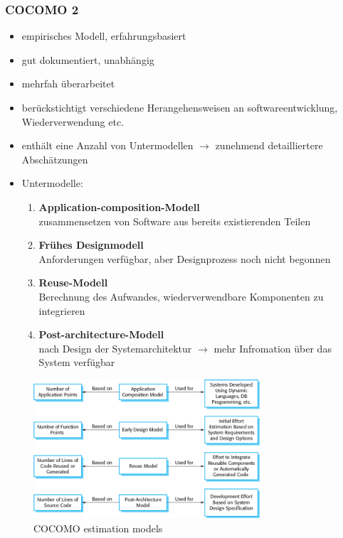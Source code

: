 \subsubsection{COCOMO 2}
\begin{itemize}
    \item empirisches Modell, erfahrungsbasiert
    \item gut dokumentiert, unabhängig
    \item mehrfah überarbeitet
    \item berückstichtigt verschiedene Herangehensweisen an softwareentwicklung, Wiederverwendung etc.
    \item enthält eine Anzahl von Untermodellen $\rightarrow$ zunehmend detailliertere Abschätzungen 
    \item Untermodelle:
    \begin{enumerate}
        \item \textbf{Application-composition-Modell} \\
        zusammensetzen von Software aus bereits existierenden Teilen
        \item \textbf{Frühes Designmodell} \\
        Anforderungen verfügbar, aber Designprozess noch nicht begonnen
        \item \textbf{Reuse-Modell} \\
        Berechnung des Aufwandes, wiederverwendbare Komponenten zu integrieren
        \item \textbf{Post-architecture-Modell}\\
        nach Design der Systemarchitektur $\rightarrow$ mehr Infromation über das System verfügbar
    \end{enumerate}
\end{itemize}
\begin{figure}[h]
    \centering
    \includegraphics[width=0.75\textwidth]{mainmatter/pics/cocomo.png}
    \caption{COCOMO estimation models}
\end{figure}

